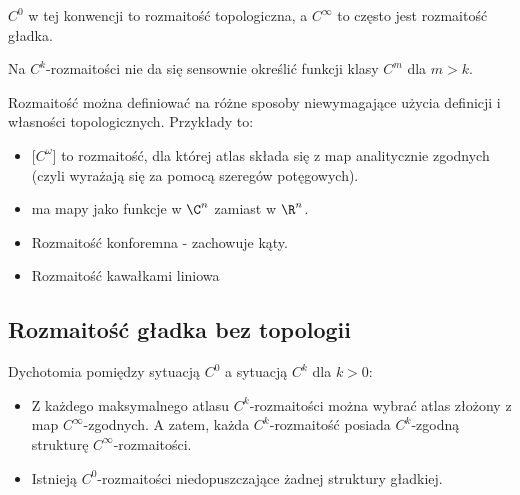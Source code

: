 $C^0$ w tej konwencji to rozmaitość topologiczna, a $C^\infty$ to często jest rozmaitość gładka.

Na $C^k$-rozmaitości nie da się sensownie określić funkcji klasy $C^m$ dla $m>k$.
\medskip

Rozmaitość można definiować na różne sposoby niewymagające użycia definicji i własności topologicznych. Przykłady to:
\begin{itemize}
    \item[\point]  [$C^\omega$] to rozmaitość, dla której atlas składa się z map analitycznie zgodnych (czyli wyrażają się za pomocą szeregów potęgowych).
    \item[\point]  ma mapy jako funkcje w $\C^n$ zamiast w $\R^n$.
    \item[\point] Rozmaitość konforemna - zachowuje kąty.
    \item[\point] Rozmaitość kawałkami liniowa
\end{itemize}

\subsection{Rozmaitość gładka bez topologii}

Dychotomia pomiędzy sytuacją $C^0$ a sytuacją $C^k$ dla $k>0$:
\begin{itemize}
    \item Z każdego maksymalnego atlasu $C^k$-rozmaitości można wybrać atlas złożony z map $C^\infty$-zgodnych. A zatem, każda $C^k$-rozmaitość posiada $C^k$-zgodną strukturę $C^\infty$-rozmaitości.
    \item Istnieją $C^0$-rozmaitości niedopuszczające żadnej struktury gładkiej.
\end{itemize}

